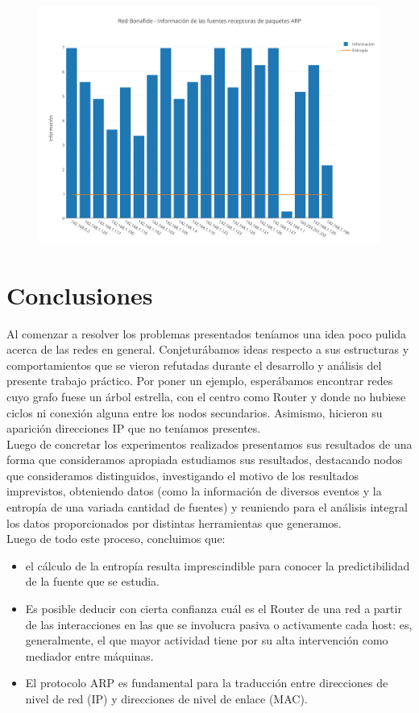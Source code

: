 \begin{figure}[h!]
    \centering                                                       
    \includegraphics[width=400pt]{img/RedBonafideFuentesReceptorasARP}
    \caption{}
    \label{bonafideReceptoras}
\end{figure}




\section{Conclusiones}

Al comenzar a resolver los problemas presentados ten\'iamos una idea poco pulida acerca de las redes en general. Conjetur\'abamos ideas respecto a sus estructuras y comportamientos que se vieron refutadas durante el desarrollo y an\'alisis del presente trabajo pr\'actico. Por poner un ejemplo, esper\'abamos encontrar redes cuyo grafo fuese un \'arbol estrella, con el centro como Router y donde no hubiese ciclos ni conexi\'on alguna entre los nodos secundarios. Asimismo, hicieron su aparici\'on direcciones IP que no ten\'iamos presentes.\\
Luego de concretar los experimentos realizados presentamos sus resultados de una forma que consideramos apropiada estudiamos sus resultados, destacando nodos que consideramos distinguidos, investigando el motivo de los resultados imprevistos, obteniendo datos (como la informaci\'on de diversos eventos y la entrop\'ia de una variada cantidad de fuentes) y reuniendo para el an\'alisis integral los datos proporcionados por distintas herramientas que generamos.\\
Luego de todo este proceso, concluimos que:
\begin{itemize}
	\item el c\'alculo de la entrop\'ia resulta imprescindible para conocer la predictibilidad de la fuente que se estudia. 
	\item Es posible deducir con cierta confianza cu\'al es el Router de una red a partir de las interacciones en las que se involucra pasiva o activamente cada host: es, generalmente, el que mayor actividad tiene por su alta intervenci\'on como mediador entre m\'aquinas.
    \item El protocolo ARP es fundamental para la traducci\'on entre direcciones de nivel de red (IP) y direcciones de nivel de enlace (MAC).  
\end{itemize}

